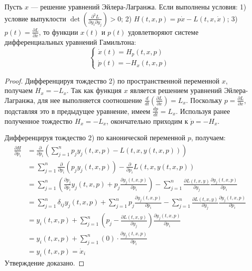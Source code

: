 \begin{proposition}
Пусть $x$ — решение уравнений Эйлера-Лагранжа. Если выполнены условия:
1) условие выпуклости $\det\left(\frac{\partial^2 L}{\partial y_i \partial y_j}\right) > 0$;
2) $H(t, x, p) = p\dot{x} - L(t, x, \dot{x})$;
3) $p(t) = \frac{\partial L}{\partial \dot{x}}$,
то функции $x(t)$ и $p(t)$ удовлетворяют системе дифференциальных уравнений Гамильтона:
\begin{equation}
\begin{cases}
\dot{x}(t) = H_p(t, x, p) \\
\dot{p}(t) = -H_x(t, x, p)
\end{cases}
\end{equation}
\end{proposition}
\begin{proof}
Дифференцируя тождество 2) по пространственной переменной $x$, получаем $H_x = -L_x$.
Так как функция $x$ является решением уравнений Эйлера-Лагранжа, для нее выполняется соотношение
$\frac{d}{dt}\left(\frac{\partial L}{\partial \dot{x}}\right) = L_x$.
Поскольку $p = \frac{\partial L}{\partial \dot{x}}$, подставляя это в предыдущее уравнение, имеем $\frac{dp}{dt} = L_x$. 
Используя ранее полученное тождество $H_x = -L_x$, окончательно приходим к $\dot{p} = -H_x$. 

Дифференцируя тождество 2) по канонической переменной $p$, получаем:
\begin{align*}
\frac{\partial H}{\partial p_i} &= \frac{\partial}{\partial p_i} \left( \sum_{j=1}^n p_j y_j(t, x, p) - L(t, x, y(t, x, p)) \right) \\
&= \sum_{j=1}^n \frac{\partial}{\partial p_i} \left( p_j y_j(t, x, p) \right) - \frac{\partial}{\partial p_i} L(t, x, y(t, x, p)) \\
&= \sum_{j=1}^n \left( \frac{\partial p_j}{\partial p_i} y_j(t, x, p) + p_j \frac{\partial y_j(t, x, p)}{\partial p_i} \right) - \sum_{j=1}^n \frac{\partial L(t, x, y)}{\partial y_j} \frac{\partial y_j(t, x, p)}{\partial p_i} \\
&= \sum_{j=1}^n \delta_{ij} y_j(t, x, p) + \sum_{j=1}^n p_j \frac{\partial y_j(t, x, p)}{\partial p_i} - \sum_{j=1}^n \frac{\partial L(t, x, y)}{\partial y_j} \frac{\partial y_j(t, x, p)}{\partial p_i} \\
&= y_i(t, x, p) + \sum_{j=1}^n \left( p_j - \frac{\partial L(t, x, y)}{\partial y_j} \right) \frac{\partial y_j(t, x, p)}{\partial p_i} \\
&= y_i(t, x, p) + \sum_{j=1}^n (0) \cdot \frac{\partial y_j(t, x, p)}{\partial p_i} \\
&= y_i(t, x, p) = \dot{x}_i
\end{align*}
Утверждение доказано.
\end{proof}

